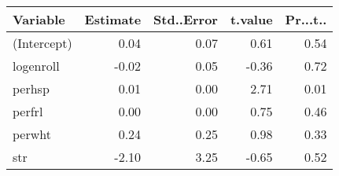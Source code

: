 \begin{tabular}{lrrrr}
  \hline
Variable & Estimate & Std..Error & t.value & Pr...t.. \\ 
  \hline
(Intercept) & 0.04 & 0.07 & 0.61 & 0.54 \\ 
  logenroll & -0.02 & 0.05 & -0.36 & 0.72 \\ 
  perhsp & 0.01 & 0.00 & 2.71 & 0.01 \\ 
  perfrl & 0.00 & 0.00 & 0.75 & 0.46 \\ 
  perwht & 0.24 & 0.25 & 0.98 & 0.33 \\ 
  str & -2.10 & 3.25 & -0.65 & 0.52 \\ 
   \hline
\end{tabular}
